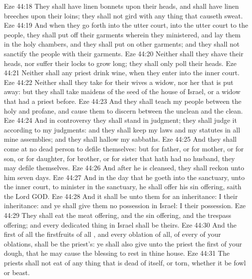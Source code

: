 \vs Eze 44:18 They shall have linen bonnets upon their heads, and shall have linen breeches upon their loins; they shall not gird  with any thing that causeth sweat.
\vs Eze 44:19 And when they go forth into the utter court,  into the utter court to the people, they shall put off their garments wherein they ministered, and lay them in the holy chambers, and they shall put on other garments; and they shall not sanctify the people with their garments.
\vs Eze 44:20 Neither shall they shave their heads, nor suffer their locks to grow long; they shall only poll their heads.
\vs Eze 44:21 Neither shall any priest drink wine, when they enter into the inner court.
\vs Eze 44:22 Neither shall they take for their wives a widow, nor her that is put away: but they shall take maidens of the seed of the house of Israel, or a widow that had a priest before.
\vs Eze 44:23 And they shall teach my people  between the holy and profane, and cause them to discern between the unclean and the clean.
\vs Eze 44:24 And in controversy they shall stand in judgment;  they shall judge it according to my judgments: and they shall keep my laws and my statutes in all mine assemblies; and they shall hallow my sabbaths.
\vs Eze 44:25 And they shall come at no dead person to defile themselves: but for father, or for mother, or for son, or for daughter, for brother, or for sister that hath had no husband, they may defile themselves.
\vs Eze 44:26 And after he is cleansed, they shall reckon unto him seven days.
\vs Eze 44:27 And in the day that he goeth into the sanctuary, unto the inner court, to minister in the sanctuary, he shall offer his sin offering, saith the Lord GOD.
\vs Eze 44:28 And it shall be unto them for an inheritance: I  their inheritance: and ye shall give them no possession in Israel: I  their possession.
\vs Eze 44:29 They shall eat the meat offering, and the sin offering, and the trespass offering; and every dedicated thing in Israel shall be theirs.
\vs Eze 44:30 And the first of all the firstfruits of all , and every oblation of all, of every  of your oblations, shall be the priest's: ye shall also give unto the priest the first of your dough, that he may cause the blessing to rest in thine house.
\vs Eze 44:31 The priests shall not eat of any thing that is dead of itself, or torn, whether it be fowl or beast.

